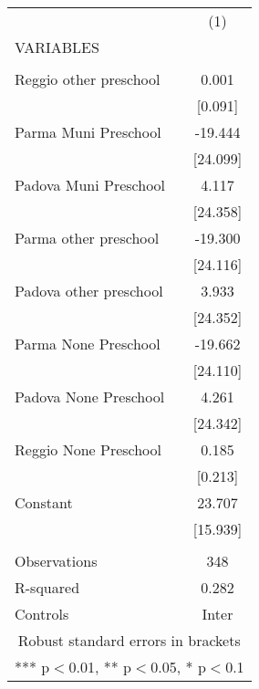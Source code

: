 \begin{tabular}{lc} \hline
 & (1) \\
VARIABLES &  \\ \hline
 &  \\
Reggio other preschool & 0.001 \\
 & [0.091] \\
Parma Muni Preschool & -19.444 \\
 & [24.099] \\
Padova Muni Preschool & 4.117 \\
 & [24.358] \\
Parma other preschool & -19.300 \\
 & [24.116] \\
Padova other preschool & 3.933 \\
 & [24.352] \\
Parma None Preschool & -19.662 \\
 & [24.110] \\
Padova None Preschool & 4.261 \\
 & [24.342] \\
Reggio None Preschool & 0.185 \\
 & [0.213] \\
Constant & 23.707 \\
 & [15.939] \\
 &  \\
Observations & 348 \\
R-squared & 0.282 \\
 Controls & Inter \\ \hline
\multicolumn{2}{c}{ Robust standard errors in brackets} \\
\multicolumn{2}{c}{ *** p$<$0.01, ** p$<$0.05, * p$<$0.1} \\
\end{tabular}
